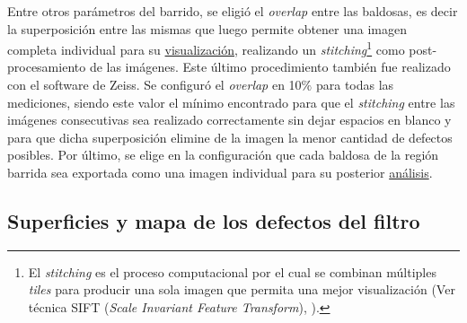 Entre otros parámetros del barrido, se eligió el \textit{overlap} entre las baldosas, es decir la superposición entre las mismas que luego permite obtener una imagen completa individual para su \underline{visualización},  realizando un \textit{stitching}\footnote{El \textit{stitching} es el proceso computacional por el cual se combinan múltiples \textit{tiles} para
producir una sola imagen que permita una mejor visualización (Ver técnica SIFT (\textit{Scale Invariant Feature Transform}), \cite{Lowe}).} como post-procesamiento de las imágenes. Este último procedimiento también fue realizado con el software de Zeiss. Se configuró el \textit{overlap} en 10$\%$ para todas las mediciones, siendo este valor el mínimo encontrado para que el \textit{stitching} entre las imágenes consecutivas sea realizado correctamente sin dejar espacios en blanco y para que dicha superposición elimine de la imagen la menor cantidad de defectos posibles. Por último, se elige en la configuración que cada baldosa de la región barrida sea exportada como una imagen individual para su posterior \underline{análisis}.

\singlespacing
\subsection{Superficies y mapa de los defectos del filtro}

